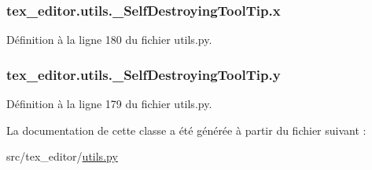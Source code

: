 \subsubsection[{x}]{\setlength{\rightskip}{0pt plus 5cm}tex\+\_\+editor.\+utils.\+\_\+\+Self\+Destroying\+Tool\+Tip.\+x}\label{classtex__editor_1_1utils_1_1___self_destroying_tool_tip_af2e6ed687659722eb809706a826755ab}


Définition à la ligne 180 du fichier utils.\+py.

\hypertarget{classtex__editor_1_1utils_1_1___self_destroying_tool_tip_a6f144a252850868a9a2d79c2e0e6076e}{}
\subsubsection[{y}]{\setlength{\rightskip}{0pt plus 5cm}tex\+\_\+editor.\+utils.\+\_\+\+Self\+Destroying\+Tool\+Tip.\+y}\label{classtex__editor_1_1utils_1_1___self_destroying_tool_tip_a6f144a252850868a9a2d79c2e0e6076e}


Définition à la ligne 179 du fichier utils.\+py.



La documentation de cette classe a été générée à partir du fichier suivant \+:\begin{DoxyCompactItemize}
\item 
src/tex\+\_\+editor/\hyperlink{utils_8py}{utils.\+py}\end{DoxyCompactItemize}
